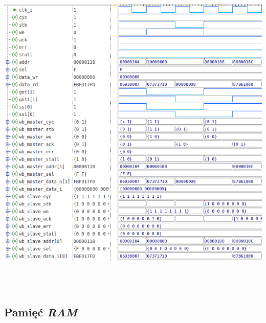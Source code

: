\documentclass[11pt,a4paper]{article}
\begin{document}
			\begin{minipage}{\textwidth}

				\begin{center}
					\includegraphics[height=16cm,width=14cm,keepaspectratio]{./rysunki/wishbone_timing.png}
				\end{center}
			\end{minipage} 
	\subsection{Pamięć \textit{RAM}}
\end{document}
